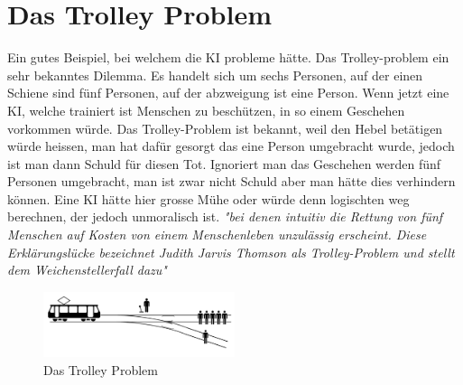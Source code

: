 \section{Das Trolley Problem}

Ein gutes Beispiel, bei welchem die KI probleme hätte. Das Trolley-problem ein sehr bekanntes Dilemma. Es handelt sich um sechs Personen, auf der einen Schiene sind fünf Personen, auf der abzweigung ist eine Person. Wenn jetzt eine KI, welche trainiert ist Menschen zu beschützen, in so einem Geschehen vorkommen würde. Das Trolley-Problem ist bekannt, weil den Hebel betätigen würde heissen, man hat dafür gesorgt das eine Person umgebracht wurde, jedoch ist man dann Schuld für diesen Tot. Ignoriert man das Geschehen werden fünf Personen umgebracht, man ist zwar nicht Schuld aber man hätte dies verhindern können. Eine KI hätte hier grosse Mühe oder würde denn logischten weg berechnen, der jedoch unmoralisch ist. \textit{"bei denen intuitiv die Rettung von fünf Menschen auf Kosten von einem Menschenleben unzulässig erscheint. Diese Erklärungslücke bezeichnet Judith Jarvis Thomson als Trolley-Problem und stellt dem Weichenstellerfall dazu" \citep{trolley-problem-wikipedia}}

\begin{figure}[h]
    \centering
    \includegraphics[width=0.5\textwidth]{Trolley_Problem.png}
    \caption{Das Trolley Problem}
    \label{fig:trolley_problem}
\end{figure}